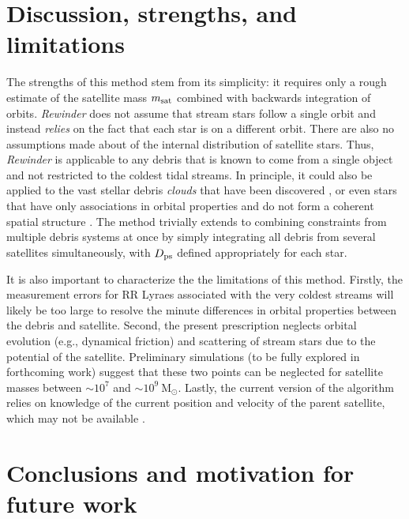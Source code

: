 \documentclass{emulateapj}
\begin{document}
\section{Discussion, strengths, and limitations}
\label{sec:discussion}

The strengths of this method stem from its simplicity: it requires
only a rough estimate of the satellite mass $m_{\rm sat}$ combined
with backwards integration of orbits. 
\emph{Rewinder} does not assume that stream stars follow
a single orbit and instead \emph{relies}
on the fact that each star is on a different orbit. There are also no assumptions made
about of the internal distribution of satellite
stars. Thus, \emph{Rewinder} is applicable to any debris that is
known to come from a single object and not restricted to the coldest
tidal streams. In principle, it could also be applied to the
vast stellar debris {\it clouds} that have been discovered 
\citep[e.g., the Triangulum-Andromeda and Hercules-Aquila
  clouds;][]{rochapinto04,belokurov06}, or even stars that have only
associations in orbital properties and do not form a coherent spatial
structure \citep[e.g.][]{helmi99}. The method trivially extends to
combining constraints from multiple debris systems at once by simply
integrating all debris from several satellites simultaneously, with
$D_{\rm ps}$ defined appropriately for each star.

It is also important to characterize the the limitations of this
method. Firstly, the measurement errors for RR Lyraes associated with
the very coldest streams \citep[e.g., the globular clusters Pal5 and
  GD1;][]{odenkirchen02,koposov10} will likely be too large to resolve
the minute differences in orbital properties between the debris and
satellite. Second, the present prescription neglects orbital evolution (e.g.,
dynamical friction) and scattering of stream stars due to the potential
of the satellite. Preliminary simulations (to be fully explored in 
forthcoming work) suggest that these two points can be neglected 
for satellite masses between $\sim$$10^7$ and $\sim$$10^9~\mathrm{M}_{\odot}$. Lastly, the 
current version of the algorithm relies on knowledge of the current 
position and velocity of the parent satellite, which may not be available 
\citep[e.g., the Orphan Stream;][]{belokurov07}. 

\section{Conclusions and motivation for future work}
\label{sec:conclusion}
\end{document}

